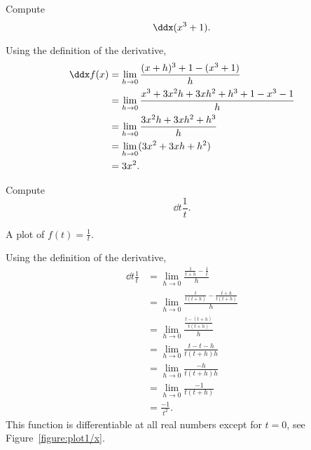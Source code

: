 \begin{example}
Compute 
\[
\ddx (x^3 + 1).
\] 
\end{example}

\begin{solution}
Using the definition of the derivative,
\begin{align*}
\ddx f(x) &= \lim_{h\to 0}\frac{(x+h)^3 + 1 - (x^3 +1)}{h}\\
&= \lim_{h\to 0}\frac{x^3+3x^2h+3xh^2 + h^3 + 1 - x^3 -1}{h}\\
&= \lim_{h\to 0}\frac{3x^2h+3xh^2 + h^3}{h}\\
&= \lim_{h\to 0}(3x^2+3xh + h^2)\\
&= 3x^2.
\end{align*}
\end{solution}



\begin{example}
Compute
\[
\dd t \frac{1}{t}.
\]
\end{example}
\begin{marginfigure}
\caption{A plot of $f(t) = \frac{1}{t}$.}
\label{figure:plot1/x}
\end{marginfigure}
\begin{solution}
Using the definition of the derivative,
\begin{align*}
\dd{t}\frac{1}{t}&=\lim_{ h\to0}\frac{\frac{1}{t+ h} - \frac{1}{t}}{h} \\
&=\lim_{h\to0}\frac{\frac{t}{t(t+ h)} - \frac{t+ h}{t(t+ h)}}{h} \\
&=\lim_{h\to0}\frac{\frac{t-(t+ h)}{t(t+ h)}}{h} \\
&=\lim_{h\to0}\frac{t-t- h}{t(t+ h) h} \\
&=\lim_{h\to0}\frac{- h}{t(t+ h) h} \\
&=\lim_{h\to0}\frac{-1}{t(t+ h)}\\
&=\frac{-1}{t^2}.
\end{align*}
This function is differentiable at all real numbers except for $t=0$, see Figure~\ref{figure:plot1/x}.
\end{solution}


